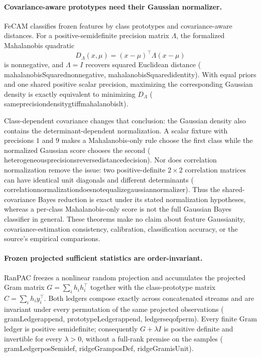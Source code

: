 \documentclass[11pt]{article}
\newcommand{\leanname}[1]{{\scriptsize\ttfamily
  \def\_{\textunderscore\allowbreak}#1}}
\begin{document}
\paragraph{Covariance-aware prototypes need their Gaussian normalizer.}
FeCAM \cite{goswami2023fecam} classifies frozen features by class prototypes
and covariance-aware distances. For a positive-semidefinite precision matrix
$\Lambda$, the formalized Mahalanobis quadratic
\[
  D_\Lambda(x,\mu)=(x-\mu)^\top\Lambda(x-\mu)
\]
is nonnegative, and $\Lambda=I$ recovers squared Euclidean distance
(\leanname{mahalanobisSquared\_nonnegative},
\leanname{mahalanobisSquared\_identity}). With equal priors and one shared
positive scalar precision, maximizing the corresponding Gaussian density is
exactly equivalent to minimizing $D_\Lambda$
(\leanname{same\_precision\_density\_gt\_iff\_mahalanobis\_lt}).

Class-dependent covariance changes that conclusion: the Gaussian density also
contains the determinant-dependent normalization. A scalar fixture with
precisions $1$ and $9$ makes a Mahalanobis-only rule choose the first class
while the normalized Gaussian score chooses the second
(\leanname{heterogeneous\_precisions\_reverse\_distance\_decision}).
Nor does correlation normalization remove the issue: two positive-definite
$2\times2$ correlation matrices can have identical unit diagonals and
different determinants
(\leanname{correlation\_normalization\_does\_not\_equalize\_gaussian\_normalizer}).
Thus the shared-covariance Bayes reduction is exact under its stated
normalization hypotheses, whereas a per-class Mahalanobis-only score is not
the full Gaussian Bayes classifier in general. These theorems make no claim
about feature Gaussianity, covariance-estimation consistency, calibration,
classification accuracy, or the source's empirical comparisons.

\paragraph{Frozen projected sufficient statistics are order-invariant.}
RanPAC \cite{mcdonnell2023ranpac} freezes a nonlinear random projection and
accumulates the projected Gram matrix $G=\sum_i h_i h_i^\top$ together with
the class-prototype matrix $C=\sum_i h_i y_i^\top$. Both ledgers compose
exactly across concatenated streams and are invariant under every permutation
of the same projected observations
(\leanname{gramLedger\_append},
\leanname{prototypeLedger\_append},
\leanname{ledgers\_eq\_of\_perm}). Every finite Gram ledger is positive
semidefinite; consequently $G+\lambda I$ is positive definite and invertible
for every $\lambda>0$, without a full-rank premise on the samples
(\leanname{gramLedger\_posSemidef},
\leanname{ridgeGram\_posDef},
\leanname{ridgeGram\_isUnit}).
\end{document}
